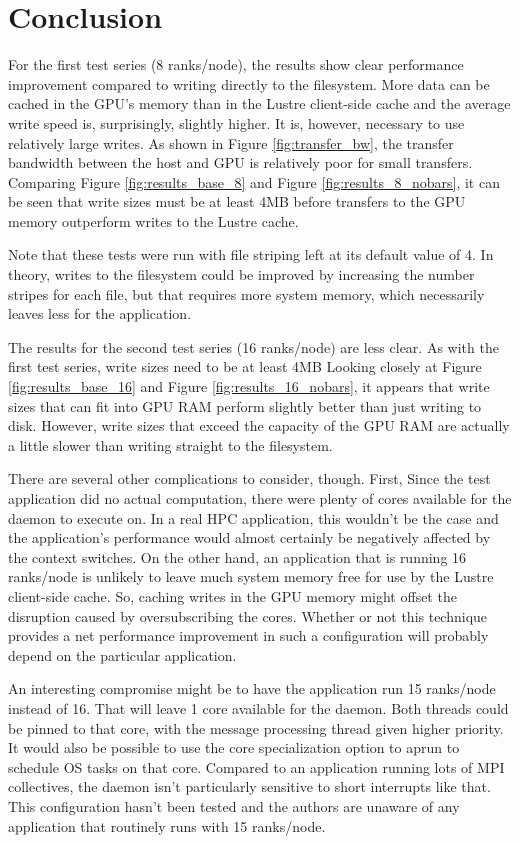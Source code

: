 \section{Conclusion}
\label{sec:conclusion}

For the first test series (8 ranks/node), the results show clear performance improvement compared to writing directly to the filesystem.   More data can be cached in the GPU's memory than in the Lustre client-side cache and the average write speed is, surprisingly, slightly higher.  It is, however, necessary to use relatively large writes.  As shown in Figure \ref{fig:transfer_bw}, the transfer bandwidth between the host and GPU is relatively poor for small transfers.  Comparing Figure \ref{fig:results_base_8} and Figure \ref{fig:results_8_nobars},  it can be seen that write sizes must be at least 4MB before transfers to the GPU memory outperform writes to the Lustre cache.

Note that these tests were run with file striping left at its default value of 4.  In theory, writes to the filesystem could be improved by increasing the number stripes for each file, but that requires more system memory, which necessarily leaves less for the application.


The results for the second test series (16 ranks/node) are less clear.  As with the first test series, write sizes need to be at least 4MB Looking closely at Figure \ref{fig:results_base_16} and Figure \ref{fig:results_16_nobars}, it appears that write sizes that can fit into GPU RAM perform slightly better than just writing to disk.  However, write sizes that exceed the capacity of the GPU RAM are actually a little slower than writing straight to the filesystem.

There are several other complications to consider, though.
First, Since the test application did no actual computation, there were plenty of cores available for the daemon to execute on.  In a real HPC application, this wouldn't be the case and the application's performance would almost certainly be negatively affected by the context switches.  On the other hand, an application that is running 16 ranks/node is unlikely to leave much system memory free for use by the Lustre client-side cache.  So, caching writes in the GPU memory might offset the disruption caused by oversubscribing the cores.  Whether or not this technique provides a net performance improvement in such a configuration will probably depend on the particular application.

An interesting compromise might be to have the application run 15 ranks/node instead of 16.  That will leave 1 core available for the daemon.  Both threads could be pinned to that core, with the message processing thread given higher priority.  It would also be possible to use the  core specialization option to aprun to schedule OS tasks on that core.  Compared to an application running lots of MPI collectives, the daemon isn't particularly sensitive to short interrupts like that.  This configuration hasn't been tested and the authors are unaware of any application that routinely runs with 15 ranks/node.

